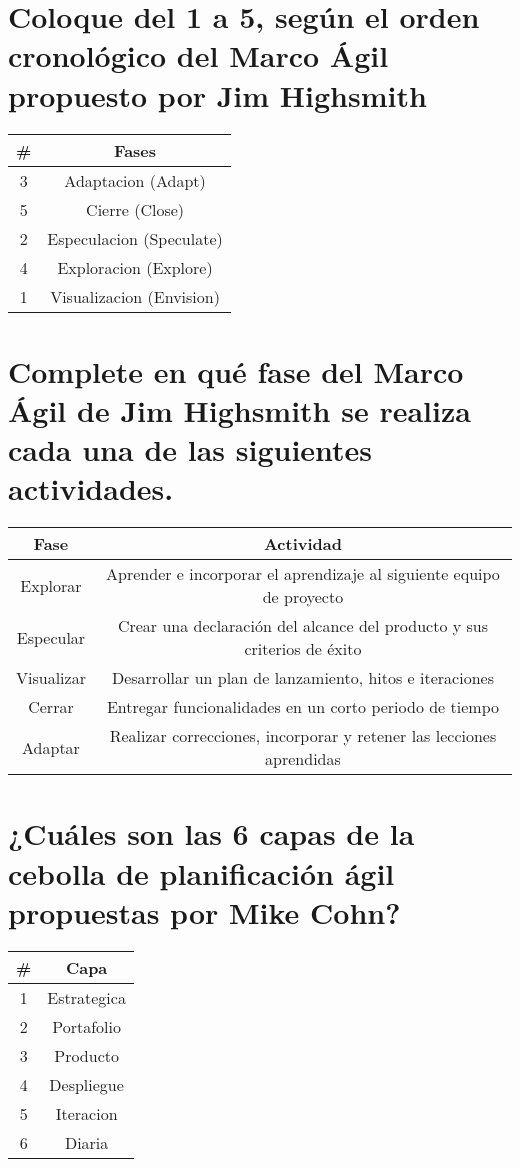 \documentclass{article}
\begin{document}
\section{Coloque del 1 a 5, según el orden cronológico del 
Marco Ágil propuesto por Jim Highsmith}

\begin{center}
\begin{tabular}{ | c | c | }
	\hline
	\# & Fases \\\hline
	3 & Adaptacion (Adapt) \\
	5 & Cierre (Close) \\
	2 & Especulacion (Speculate) \\
	4 & Exploracion (Explore) \\
	1 & Visualizacion (Envision) \\\hline
\end{tabular}
\end{center}

\section{Complete en qué fase del Marco Ágil de Jim Highsmith se 
realiza cada una de las siguientes actividades.}

\begin{center}
\begin{tabular}{ | c | c | }
	\hline
	Fase & Actividad \\\hline
	Explorar & Aprender e incorporar el aprendizaje al siguiente equipo de proyecto \\
	Especular & Crear una declaración del alcance del producto y sus criterios de éxito \\
	Visualizar & Desarrollar un plan de lanzamiento, hitos e iteraciones\\
	Cerrar & Entregar funcionalidades en un corto periodo de tiempo\\
	Adaptar & Realizar correcciones, incorporar y retener las lecciones aprendidas\\\hline

\end{tabular}
\end{center}

\section{¿Cuáles son las 6 capas de la cebolla de planificación ágil propuestas por Mike Cohn?}

\begin{center}
\begin{tabular}{ | c | c | }
	\hline
	\# & Capa \\\hline
	1 & Estrategica \\
	2 & Portafolio \\
	3 & Producto \\
	4 & Despliegue \\
	5 & Iteracion\\
	6 & Diaria \\\hline
\end{tabular}
\end{center}
\end{document}
